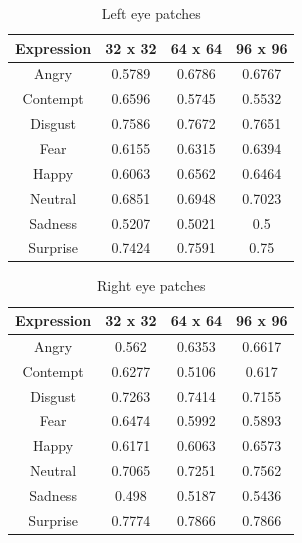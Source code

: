 
\begin{table}
\caption{Left eye patches}
\label{table:left_eye}

\begin{tabular}{| c | c | c | c |}
\hline
Expression & 32 x 32 &  64 x 64  & 96 x 96  \\

\hline
Angry & 0.5789 & 0.6786 & 0.6767 \\
Contempt & 0.6596 &	0.5745 & 0.5532 \\
Disgust	& 0.7586 &	0.7672 &	0.7651 \\
Fear &	0.6155 & 0.6315 & 0.6394 \\ 
Happy &	0.6063 & 0.6562 & 0.6464 \\ 
Neutral & 0.6851 &	0.6948 & 0.7023 \\
Sadness & 0.5207 & 0.5021 &	0.5 \\
Surprise & 0.7424 &	0.7591 & 0.75 \\

\hline
\end{tabular}
\end{table}

\begin{table}
\caption{Right eye patches}
\label{table:right_eye}

\begin{tabular}{| c | c | c | c |}
\hline
Expression & 32 x 32 &  64 x 64  & 96 x 96  \\

\hline
Angry    & 0.562 & 0.6353 & 0.6617 \\
Contempt & 0.6277 & 0.5106 & 0.617 \\ 
Disgust	 & 0.7263 & 0.7414 & 0.7155 \\
Fear	 & 0.6474 & 0.5992 & 0.5893 \\
Happy	 & 0.6171 & 0.6063 & 0.6573 \\
Neutral  & 0.7065 & 0.7251 & 0.7562 \\
Sadness  & 0.498 & 0.5187 & 0.5436 \\
Surprise & 0.7774 & 0.7866 & 0.7866 \\

\hline
\end{tabular}
\end{table}

